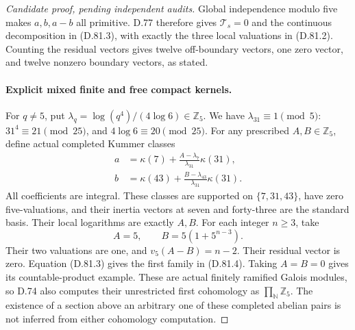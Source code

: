 \begin{proof}[Candidate proof, pending independent audits]
Global independence modulo five makes \(a,b,a-b\)
all primitive. D.77 therefore gives
\(\mathcal T_s=0\) and the continuous decomposition in
(D.81.3), with exactly the three local valuations in
(D.81.2). Counting the residual vectors gives twelve
off-boundary vectors, one zero vector, and twelve
nonzero boundary vectors, as stated.

\paragraph{Explicit mixed finite and free compact kernels.}
For \(q\ne5\), put
\(\lambda_q=\log(q^4)/(4\log6)\in\mathbb Z_5\).
We have \(\lambda_{31}\equiv1\pmod5\):
\(31^4\equiv21\pmod{25}\), and \(4\log6\equiv20\pmod{25}\).
For any prescribed \(A,B\in\mathbb Z_5\), define actual
completed Kummer classes
\[
 \begin{split}
 a&=\kappa(7)+
       \frac{A-\lambda_7}{\lambda_{31}}\kappa(31),\\
 b&=\kappa(43)+
       \frac{B-\lambda_{43}}{\lambda_{31}}\kappa(31).
 \end{split}                                                 \tag{D.81.20}
\]
All coefficients are integral. These classes are supported
on \(\{7,31,43\}\), have zero five-valuations, and their
inertia vectors at seven and forty-three are the standard
basis. Their local logarithms are exactly \(A,B\).
For each integer \(n\ge3\), take
\[
                 A=5,\qquad B=5(1+5^{n-3}).
                                                               \tag{D.81.21}
\]
Their two valuations are one, and
\(v_5(A-B)=n-2\). Their residual vector is zero.
Equation (D.81.3) gives the first family in (D.81.4).
Taking \(A=B=0\) gives its countable-product example.
These are actual finitely ramified Galois modules, so
D.74 also computes their unrestricted first cohomology
as \(\prod_{\mathbb N}\mathbb Z_5\).
The existence of a section above an arbitrary one of
these completed abelian pairs is not inferred from
either cohomology computation.
\end{proof}
